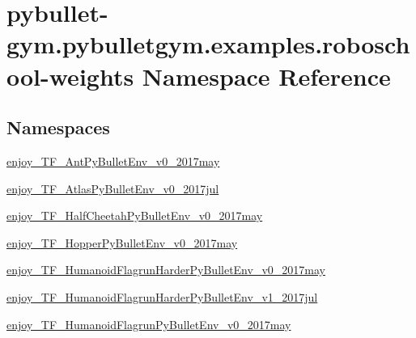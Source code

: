 \hypertarget{namespacepybullet-gym_1_1pybulletgym_1_1examples_1_1roboschool-weights}{}\section{pybullet-\/gym.pybulletgym.\+examples.\+roboschool-\/weights Namespace Reference}
\label{namespacepybullet-gym_1_1pybulletgym_1_1examples_1_1roboschool-weights}
\subsection*{Namespaces}
\begin{DoxyCompactItemize}
\item 
 \hyperlink{namespacepybullet-gym_1_1pybulletgym_1_1examples_1_1roboschool-weights_1_1enjoy___t_f___ant_py_bullet_env__v0__2017may}{enjoy\+\_\+\+T\+F\+\_\+\+Ant\+Py\+Bullet\+Env\+\_\+v0\+\_\+2017may}
\item 
 \hyperlink{namespacepybullet-gym_1_1pybulletgym_1_1examples_1_1roboschool-weights_1_1enjoy___t_f___atlas_py_bullet_env__v0__2017jul}{enjoy\+\_\+\+T\+F\+\_\+\+Atlas\+Py\+Bullet\+Env\+\_\+v0\+\_\+2017jul}
\item 
 \hyperlink{namespacepybullet-gym_1_1pybulletgym_1_1examples_1_1roboschool-weights_1_1enjoy___t_f___half_cheetah_py_bullet_env__v0__2017may}{enjoy\+\_\+\+T\+F\+\_\+\+Half\+Cheetah\+Py\+Bullet\+Env\+\_\+v0\+\_\+2017may}
\item 
 \hyperlink{namespacepybullet-gym_1_1pybulletgym_1_1examples_1_1roboschool-weights_1_1enjoy___t_f___hopper_py_bullet_env__v0__2017may}{enjoy\+\_\+\+T\+F\+\_\+\+Hopper\+Py\+Bullet\+Env\+\_\+v0\+\_\+2017may}
\item 
 \hyperlink{namespacepybullet-gym_1_1pybulletgym_1_1examples_1_1roboschool-weights_1_1enjoy___t_f___humanoid6cf5bb1cece630011749e55e6e33a106}{enjoy\+\_\+\+T\+F\+\_\+\+Humanoid\+Flagrun\+Harder\+Py\+Bullet\+Env\+\_\+v0\+\_\+2017may}
\item 
 \hyperlink{namespacepybullet-gym_1_1pybulletgym_1_1examples_1_1roboschool-weights_1_1enjoy___t_f___humanoid9dba9dbbc727c9140c0c88eec28e43d0}{enjoy\+\_\+\+T\+F\+\_\+\+Humanoid\+Flagrun\+Harder\+Py\+Bullet\+Env\+\_\+v1\+\_\+2017jul}
\item 
 \hyperlink{namespacepybullet-gym_1_1pybulletgym_1_1examples_1_1roboschool-weights_1_1enjoy___t_f___humanoid5ce30284d6415ebf8c921e22a512fe3a}{enjoy\+\_\+\+T\+F\+\_\+\+Humanoid\+Flagrun\+Py\+Bullet\+Env\+\_\+v0\+\_\+2017may}

\end{DoxyCompactItemize}

